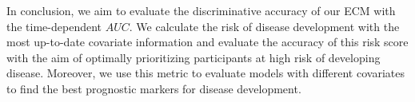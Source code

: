 In conclusion, we aim to evaluate the discriminative accuracy of our ECM with the time-dependent $AUC$. We calculate the risk of disease development with the most up-to-date covariate information and evaluate the accuracy of this risk score with the aim of optimally prioritizing participants at high risk of developing disease. Moreover, we use this metric to evaluate models with different covariates to find the best prognostic markers for disease development. 










